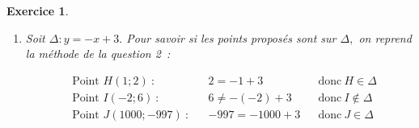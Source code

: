 \documentclass[10pt]{article}
\newtheorem{exo}{Exercice}
\begin{document}
\begin{exo}
\begin{enumerate}
Faisons le calcul pour chacun des points proposés. On les place ensuite en bleu sur le graphique s'ils sont sur $d,$ en rouge sinon.

\begin{align*}
&\text{Point }A(1;-1)~: &&-1\not=0,5\times 1-2&&\text{donc}~A\notin d\\
&\text{Point }B(4;0)~: &&0=0,5\times 4-2&&\text{donc}~B\in d\\
&\text{Point }C(-2;-3)~: &&-3=0,5\times (-2)-2&&\text{donc}~C\in d\\
&\text{Point }E(5;1)~: &&1\not=0,5\times 5-2&&\text{donc}~E\notin d\\
\end{align*}

\item Soit $\Delta:y=-x+3.$ Pour savoir si les points proposés sont sur $\Delta,$ on reprend la méthode de la question 2~:

\begin{align*}
&\text{Point }H(1;2)~: &&2=-1+3&&\text{donc}~H\in \Delta\\
&\text{Point }I(-2;6)~: &&6\not=-(-2)+3&&\text{donc}~I\notin \Delta\\
&\text{Point }J(1000;-997)~: &&-997=-1000+3&&\text{donc}~J\in \Delta\\
\end{align*}

\end{enumerate}

\end{exo}
\end{document}
